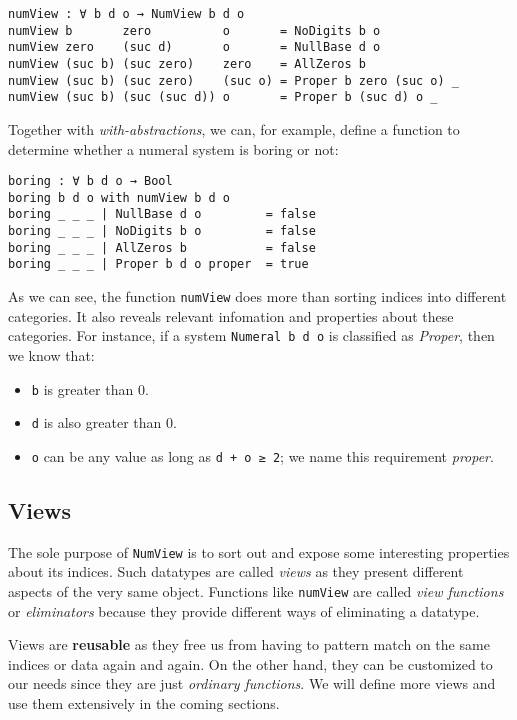 \documentclass[\main/thesis.tex]{subfiles}
\begin{document}
\begin{lstlisting}
numView : ∀ b d o → NumView b d o
numView b       zero          o       = NoDigits b o
numView zero    (suc d)       o       = NullBase d o
numView (suc b) (suc zero)    zero    = AllZeros b
numView (suc b) (suc zero)    (suc o) = Proper b zero (suc o) _
numView (suc b) (suc (suc d)) o       = Proper b (suc d) o _
\end{lstlisting}

Together with \textit{with-abstractions}, we can, for example, define a function
to determine whether a numeral system is boring or not:

\begin{lstlisting}
boring : ∀ b d o → Bool
boring b d o with numView b d o
boring _ _ _ | NullBase d o         = false
boring _ _ _ | NoDigits b o         = false
boring _ _ _ | AllZeros b           = false
boring _ _ _ | Proper b d o proper  = true
\end{lstlisting}

As we can see, the function {\lstinline|numView|} does more than sorting indices
into different categories. It also reveals relevant infomation and properties
about these categories. For instance, if a system {\lstinline|Numeral b d o|}
is classified as \textit{Proper}, then we know that:

\begin{itemize}
    \item {\lstinline|b|} is greater than $ 0 $.
    \item {\lstinline|d|} is also greater than $ 0 $.
    \item {\lstinline|o|} can be any value as long as {\lstinline|d + o ≥ 2|};
        we name this requirement \textit{proper}.
\end{itemize}

\subsection{Views}

The sole purpose of {\lstinline|NumView|} is to sort out and expose some
interesting properties about its indices.
Such datatypes are called \textit{views}\cite{wadler1987views} as they present
different aspects of the very same object.
Functions like {\lstinline|numView|} are called \textit{view functions} or
\textit{eliminators}\cite{mcbride2004views} because they provide different ways
of eliminating a datatype.

Views are \textbf{reusable} as they free us from having to pattern match on the
same indices or data again and again. On the other hand, they can be customized
to our needs since they are just \textit{ordinary functions}.
We will define more views and use them extensively in the coming sections.
\end{document}
